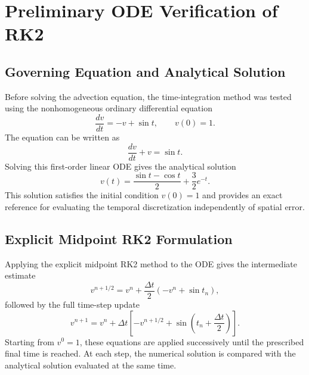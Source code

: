 
\section{Preliminary ODE Verification of RK2}
\label{app:preliminary-rk2-ode}

\subsection{Governing Equation and Analytical Solution}
\label{app:rk2-ode-analytical-solution}

Before solving the advection equation, the time-integration method was tested using the nonhomogeneous ordinary differential equation
\begin{equation}
    \frac{dv}{dt}=-v+\sin t,
    \qquad v(0)=1.
    \label{eq:app-rk2-ode}
\end{equation}
The equation can be written as
\begin{equation}
    \frac{dv}{dt}+v=\sin t.
\end{equation}
Solving this first-order linear ODE gives the analytical solution
\begin{equation}
    \boxed{
    v(t)=\frac{\sin t-\cos t}{2}+\frac{3}{2}e^{-t}
    }.
    \label{eq:app-rk2-ode-exact}
\end{equation}
This solution satisfies the initial condition $v(0)=1$ and provides an exact reference for evaluating the temporal discretization independently of spatial error.

\subsection{Explicit Midpoint RK2 Formulation}
\label{app:rk2-ode-formulation}

Applying the explicit midpoint RK2 method to the ODE gives the intermediate estimate
\begin{equation}
    v^{n+1/2}=v^n+\frac{\Delta t}{2}
    \left(-v^n+\sin t_n\right),
    \label{eq:app-rk2-ode-midpoint}
\end{equation}
followed by the full time-step update
\begin{equation}
    v^{n+1}=v^n+\Delta t
    \left[-v^{n+1/2}
    +\sin\left(t_n+\frac{\Delta t}{2}\right)\right].
    \label{eq:app-rk2-ode-update}
\end{equation}
Starting from $v^0=1$, these equations are applied successively until the prescribed final time is reached. At each step, the numerical solution is compared with the analytical solution evaluated at the same time.

